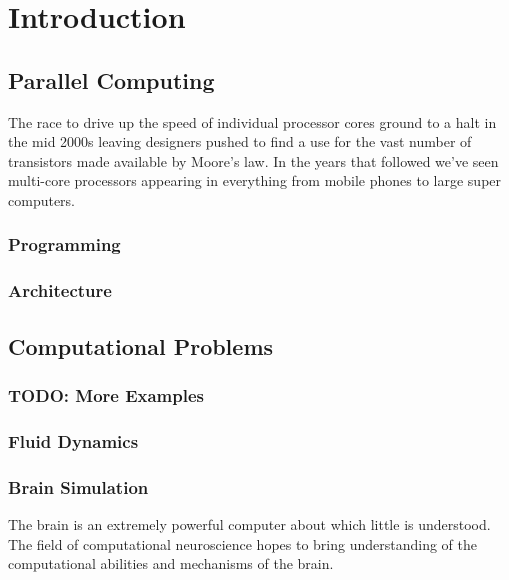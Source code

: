 \chapter{Introduction}
	
	\section{Parallel Computing}
		
		The race to drive up the speed of individual processor cores ground to a
		halt in the mid 2000s leaving designers pushed to find a use for the vast
		number of transistors made available by Moore's law. In the years that
		followed we've seen multi-core processors appearing in everything from
		mobile phones to large super computers.
			
		\subsection{Programming}
		
		\subsection{Architecture}
	
	\section{Computational Problems}
		
		\subsection{TODO: More Examples}
		
		\subsection{Fluid Dynamics}
		
		\subsection{Brain Simulation}
			
			
			The brain is an extremely powerful computer about which little is
			understood. The field of computational neuroscience hopes to bring
			understanding of the computational abilities and mechanisms of the
			brain.
			
